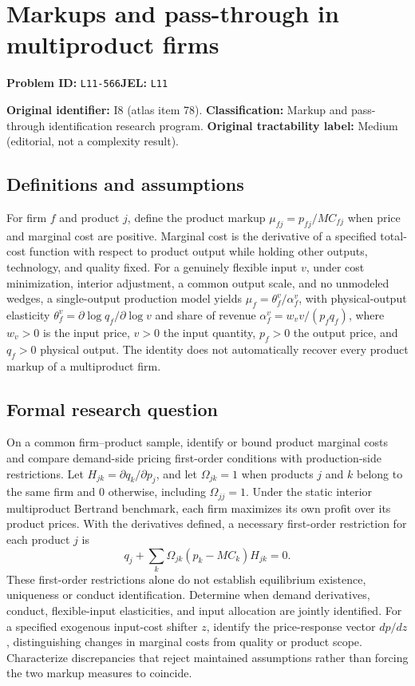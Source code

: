 \documentclass[11pt,a4paper]{article}
\begin{document}
\section*{Markups and pass-through in multiproduct firms}
\textbf{Problem ID:} \texttt{L11-566}\quad \textbf{JEL:} \texttt{L11}\par
\label{problem:OP-0078}
\label{atlas:prob:I8}

\noindent\textbf{Original identifier:} I8 (atlas item 78). \textbf{Classification:} Markup and pass-through identification research program. \textbf{Original tractability label:} Medium (editorial, not a complexity result).

\subsection*{Definitions and assumptions}

For firm $f$ and product $j$, define the product markup $\mu_{fj}=p_{fj}/MC_{fj}$ when price and marginal cost are positive. Marginal cost is the derivative of a specified total-cost function with respect to product output while holding other outputs, technology, and quality fixed. For a genuinely flexible input $v$, under cost minimization, interior adjustment, a common output scale, and no unmodeled wedges, a single-output production model yields $\mu_f=\theta_f^v/\alpha_f^v$, with physical-output elasticity $\theta_f^v=\partial\log q_f/\partial\log v$ and share of revenue $\alpha_f^v=w_vv/(p_fq_f)$, where $w_v>0$ is the input price, $v>0$ the input quantity, $p_f>0$ the output price, and $q_f>0$ physical output. The identity does not automatically recover every product markup of a multiproduct firm.

\subsection*{Formal research question}

On a common firm--product sample, identify or bound product marginal costs and compare demand-side pricing first-order conditions with production-side restrictions. Let $H_{jk}=\partial q_k/\partial p_j$, and let $\Omega_{jk}=1$ when products $j$ and $k$ belong to the same firm and $0$ otherwise, including $\Omega_{jj}=1$. Under the static interior multiproduct Bertrand benchmark, each firm maximizes its own profit over its product prices. With the derivatives defined, a necessary first-order restriction for each product $j$ is
\[
q_j+\sum_k\Omega_{jk}(p_k-MC_k)H_{jk}=0.
\]
These first-order restrictions alone do not establish equilibrium existence, uniqueness or conduct identification. Determine when demand derivatives, conduct, flexible-input elasticities, and input allocation are jointly identified. For a specified exogenous input-cost shifter $z$, identify the price-response vector $dp/dz$, distinguishing changes in marginal costs from quality or product scope. Characterize discrepancies that reject maintained assumptions rather than forcing the two markup measures to coincide.
\end{document}
